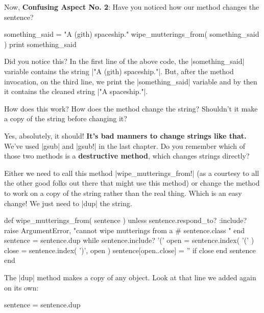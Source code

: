 \documentclass[12pt,twoside]{report}
\begin{document}
Now, {\bf Confusing Aspect No. 2}: Have you noticed how our method
changes the sentence?


\begin{rubycode}

 something_said = "A (gith) spaceship."
 wipe_mutterings_from( something_said )
 print something_said

\end{rubycode}


Did you notice this?  In the first line of the above code, the
\rubyinline|something_said| variable contains the
string \rubyinline|"A (gith) spaceship."|.  But, after
the method invocation, on the third line, we print the
\rubyinline|something_said| variable and by then it
contains the cleaned string \rubyinline|"A spaceship."|.

How does this work?  How does the method change the string?  Shouldn't
it make a copy of the string before changing it?

Yes, absolutely, it should!  {\bf It's bad manners to change strings
  like that.}  We've used \rubyinline|gsub| and
\rubyinline|gsub!| in the last chapter.  Do you
remember which of those two methods is a {\bf destructive method},
which changes strings directly?

Either we need to call this method
\rubyinline|wipe_mutterings_from!| (as a courtesy to
all the other good folks out there that might use this method) or
change the method to work on a copy of the string rather than the real
thing.  Which is an easy change!  We just need to
\rubyinline|dup| the string.


\begin{rubycode}

 def wipe_mutterings_from( sentence )
   unless sentence.respond_to? :include?
     raise ArgumentError,
       "cannot wipe mutterings from a #{ sentence.class }"
   end
   sentence = sentence.dup
   while sentence.include? '('
     open = sentence.index( '(' )
     close = sentence.index( ')', open )
     sentence[open..close] = '' if close
   end
   sentence
 end

\end{rubycode}


The \rubyinline|dup| method makes a copy of any
object.  Look at that line we added again on its own:


\begin{rubycode}

 sentence = sentence.dup

\end{rubycode}
\end{document}
